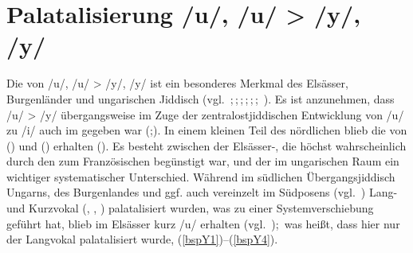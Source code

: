  \section{Palatalisierung /u/, /u\textlengthmark/ > /y/, /y\textlengthmark/}\label{phonpalat}
 Die  von /u/, /u\textlengthmark/ > /y/, /y\textlengthmark/ ist ein besonderes Merkmal des Elsässer, Burgenländer und ungarischen Jiddisch (vgl.\, \citealt{Birnbaum1934};\,\citealt[108]{GuggenheimGruenberg1973};\,\citealt[1027]{Katz1983};\,\citealt[171f]{Timm1987};\,\citealt{Hutterer1965};\,\citealt[83]{Herzog1992};\, \citealt{Schaefer2017}). Es ist anzunehmen, dass /u\textlengthmark/ > /y/ übergangsweise im Zuge der zentralostjiddischen Entwicklung von /u\textlengthmark/ zu /i/ auch im \hai{{\ZOJ}} gegeben war (\citealt{Birnbaum1934};\citealt[1029]{Katz1983}). In einem kleinen Teil des nördlichen \hai{{\SOJ}} blieb die  von  () und  () erhalten (\citealt[83]{Herzog1992}). Es besteht zwischen der Elsässer-, die höchst wahrscheinlich durch den  zum Französischen begünstigt war, und der  im ungarischen Raum ein wichtiger systematischer Unterschied. Während im südlichen Übergangsjiddisch Ungarns, des Burgenlandes und ggf. auch vereinzelt im \hai{{\ZOJ}} Südposens  (vgl.\, \citealt{FleischerSchaeferErsch,Schaefer2017}) Lang- und Kurzvokal (, , ) palatalisiert wurden, was zu einer Systemverschiebung geführt hat, blieb im Elsässer  kurz /u/ erhalten (vgl.\, \citealt{Birnbaum1934});\, was heißt, dass hier nur der Langvokal palatalisiert wurde, (\ref{bspY1})--(\ref{bspY4}).
 


